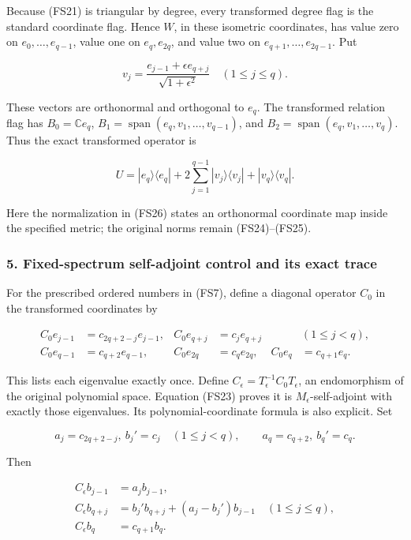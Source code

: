 Because (FS21) is triangular by degree, every transformed degree flag is the standard coordinate flag. Hence \(W\), in these isometric coordinates, has value zero on \(e_0,\ldots,e_{q-1}\), value one on \(e_q,e_{2q}\), and value two on \(e_{q+1},\ldots,e_{2q-1}\). Put

\[
v_j=\frac{e_{j-1}+\epsilon e_{q+j}}{\sqrt{1+\epsilon^2}}
\quad(1\le j\le q).
\tag{FS26}
\]

These vectors are orthonormal and orthogonal to \(e_q\). The transformed relation flag has \(B_0=\mathbb C e_q\), \(B_1=\operatorname{span}(e_q,v_1,\ldots,v_{q-1})\), and \(B_2=\operatorname{span}(e_q,v_1,\ldots,v_q)\). Thus the exact transformed operator is

\[
U=|e_q\rangle\langle e_q|
+2\sum_{j=1}^{q-1}|v_j\rangle\langle v_j|
+|v_q\rangle\langle v_q|.
\tag{FS27}
\]

Here the normalization in (FS26) states an orthonormal coordinate map inside the specified metric; the original norms remain (FS24)--(FS25).

\subsubsection{5. Fixed-spectrum self-adjoint control and its exact trace}\label{endpoint-four_window_sharpness--fixed-spectrum-self-adjoint-control-and-its-exact-trace}

For the prescribed ordered numbers in (FS7), define a diagonal operator \(C_0\) in the transformed coordinates by

\[
\begin{aligned}
C_0e_{j-1}&=c_{2q+2-j}e_{j-1},&
C_0e_{q+j}&=c_j e_{q+j}&&(1\le j<q),\\
C_0e_{q-1}&=c_{q+2}e_{q-1},&
C_0e_{2q}&=c_qe_{2q},&
C_0e_q&=c_{q+1}e_q.
\end{aligned}
\tag{FS28}
\]

This lists each eigenvalue exactly once. Define \(C_\epsilon=T_\epsilon^{-1}C_0T_\epsilon\), an endomorphism of the original polynomial space. Equation (FS23) proves it is \(M_\epsilon\)-self-adjoint with exactly those eigenvalues. Its polynomial-coordinate formula is also explicit. Set

\[
a_j=c_{2q+2-j},\ b_j'=c_j\quad(1\le j<q),
\qquad a_q=c_{q+2},\ b_q'=c_q.
\]

Then

\[
\begin{aligned}
C_\epsilon b_{j-1}&=a_j b_{j-1},\\
C_\epsilon b_{q+j}&=b_j' b_{q+j}+(a_j-b_j')b_{j-1}
\quad(1\le j\le q),\\
C_\epsilon b_q&=c_{q+1}b_q.
\end{aligned}
\tag{FS29}
\]

